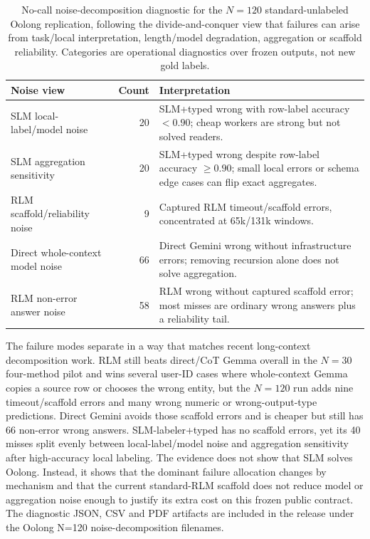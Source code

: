 \begin{table}[t]
\centering
\small
\setlength{\tabcolsep}{3pt}
\begin{tabular}{@{}p{2.5cm}rp{4.1cm}@{}}
\toprule
\textbf{Noise view} & \textbf{Count} & \textbf{Interpretation} \\
\midrule
SLM local-label/model noise & 20 & SLM+typed wrong with row-label accuracy $<0.90$; cheap workers are strong but not solved readers. \\
SLM aggregation sensitivity & 20 & SLM+typed wrong despite row-label accuracy $\ge0.90$; small local errors or schema edge cases can flip exact aggregates. \\
RLM scaffold/reliability noise & 9 & Captured RLM timeout/scaffold errors, concentrated at 65k/131k windows. \\
Direct whole-context model noise & 66 & Direct Gemini wrong without infrastructure errors; removing recursion alone does not solve aggregation. \\
RLM non-error answer noise & 58 & RLM wrong without captured scaffold error; most misses are ordinary wrong answers plus a reliability tail. \\
\bottomrule
\end{tabular}
\caption{No-call noise-decomposition diagnostic for the $N=120$ standard-unlabeled Oolong replication, following the divide-and-conquer view that failures can arise from task/local interpretation, length/model degradation, aggregation or scaffold reliability. Categories are operational diagnostics over frozen outputs, not new gold labels.}
\label{tab:supp-oolong-noise}
\end{table}

The failure modes separate in a way that matches recent long-context decomposition work. RLM still beats direct/CoT Gemma overall in the $N=30$ four-method pilot and wins several user-ID cases where whole-context Gemma copies a source row or chooses the wrong entity, but the $N=120$ run adds nine timeout/scaffold errors and many wrong numeric or wrong-output-type predictions. Direct Gemini avoids those scaffold errors and is cheaper but still has 66 non-error wrong answers. SLM-labeler+typed has no scaffold errors, yet its 40 misses split evenly between local-label/model noise and aggregation sensitivity after high-accuracy local labeling. The evidence does not show that SLM solves Oolong. Instead, it shows that the dominant failure allocation changes by mechanism and that the current standard-RLM scaffold does not reduce model or aggregation noise enough to justify its extra cost on this frozen public contract. The diagnostic JSON, CSV and PDF artifacts are included in the release under the Oolong N=120 noise-decomposition filenames.

